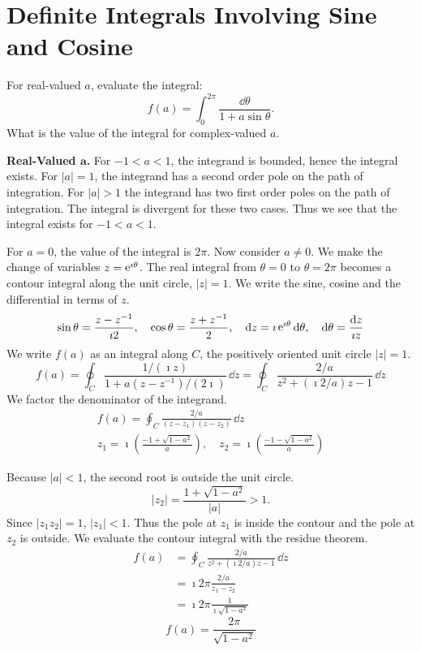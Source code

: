 \section{Definite Integrals Involving Sine and Cosine}








\begin{Example}
  For real-valued $a$, evaluate the integral:
  \[ 
  f(a) = \int_0^{2\pi} \frac{\dd \theta}{1+a \sin \theta}.
  \]
  What is the value of the integral for complex-valued $a$.

  \textbf{Real-Valued $\mathbf{a}$.}
  For $-1 < a < 1$, the integrand is bounded, hence the integral exists.  
  For $|a| = 1$, the integrand has a second order pole on the path of 
  integration.  For $|a| > 1$ the integrand has two first order poles on 
  the path of integration.  The integral is divergent for these two cases.
  Thus we see that the integral exists for $-1 < a < 1$.

  For $a=0$, the value of the integral is $2 \pi$.  Now consider $a \neq 0$.
  We make the change of variables $z = \mathop{\mathrm{e}}\nolimits^{\imath \theta}$.  The real integral
  from $\theta = 0$ to $\theta = 2 \pi$ becomes a contour integral 
  along the unit circle, $|z| = 1$.  We write the sine, cosine and the 
  differential in terms of $z$.
  \[
  \sin \theta = \frac{z-z^{-1}}{\imath 2},\quad 
  \cos \theta = \frac{z+z^{-1}}{2}, \quad 
  \mathrm{d} z = \imath \mathop{\mathrm{e}}\nolimits^{\imath \theta} \mathrm{d} \theta, \quad
  \mathrm{d} \theta = \frac{\mathrm{d} z}{\imath z}
  \]
  We write $f(a)$ as an integral along $C$, the positively oriented 
  unit circle $|z| = 1$.  
  \[
  f(a) = \oint_C \frac{ 1/(\imath z) }{ 1 + a (z - z^{-1}) / (2 \imath) } \,\dd z
  = \oint_C \frac{2 / a}{z^2 + (\imath 2 / a) z - 1}\,\dd z
  \]
  We factor the denominator of the integrand.
  \begin{gather*}
    f(a) = \oint_C \frac{2/a}{(z-z_1)(z-z_2)}\,\dd z \\
    z_1 = \imath \left(\frac{-1+\sqrt{1-a^2}}{a} \right),\quad
    z_2 = \imath \left(\frac{-1-\sqrt{1-a^2}}{a} \right) 
  \end{gather*}

  Because $|a| < 1$, the second root is outside the unit circle.
  \[ 
  |z_2| = \frac{1+\sqrt{1-a^2}}{|a|} > 1. 
  \]
  Since $|z_1 z_2| = 1$, $|z_1| < 1$.  Thus the pole at $z_1$ is inside the
  contour and the pole at $z_2$ is outside.  
  We evaluate the contour integral with the residue theorem.
  \begin{align*}
    f(a) &= \oint_C \frac{2/a}{z^2 + (\imath 2 / a) z -1} \,\dd z \\
    &= \imath 2 \pi \frac{2/a}{z_1-z_2} \\
    &= \imath 2 \pi \frac{1}{\imath \sqrt{1-a^2}}
  \end{align*}
  \[
  \boxed{
    f(a) = \frac{2\pi}{\sqrt{1-a^2}}
    }
  \]


\end{Example}
